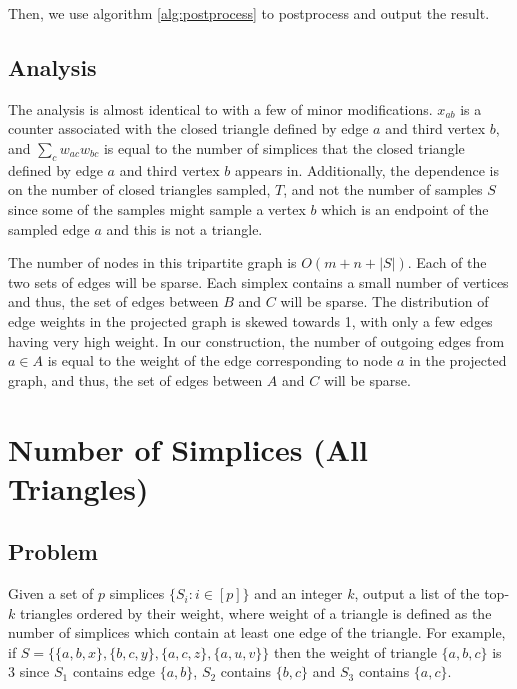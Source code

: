 \documentclass{article}
\begin{document}
Then, we use algorithm \ref{alg:postprocess} to postprocess and output the result.


\subsection{Analysis}

The analysis is almost identical to \cite{diamond} with a few
of minor modifications.
$x_{ab}$ is a counter associated with
the closed triangle defined by edge $a$ and third vertex $b$,
and $\sum\limits_c w_{ac}w_{bc}$ is equal to the number of 
simplices that the closed triangle defined by edge $a$ and 
third vertex $b$ appears in.
Additionally, the dependence is on the number of closed triangles sampled, $T$,
and not the number of samples $S$ since some of the samples might 
sample a vertex $b$ which is an endpoint of the sampled edge $a$ and this
is not a triangle.

The number of nodes in this tripartite graph is $O(m + n + |S|)$.
Each of the two sets of edges will be sparse.
Each simplex contains a small number of vertices and thus,
the set of edges between $B$ and $C$ will be sparse.
The distribution of edge weights in the projected graph is skewed
towards 1, with only a few edges having very high weight. In our construction,
the number of outgoing edges from $a \in A$ is equal to the weight
of the edge corresponding to node $a$ in the projected graph,
and thus, the set of edges between $A$ and $C$ will be sparse.



\section{Number of Simplices (All Triangles)}

\subsection{Problem}
Given a set of $p$ simplices $\{S_i : i \in [p]\}$ and
an integer $k$, output a list of the top-$k$
triangles ordered by their weight, where weight of a 
triangle is defined as the number of simplices which
contain at least one edge of the triangle.
For example, if $S = \{\{a,b,x\}, \{b,c,y\}, 
\{a,c,z\}, \{a,u,v\} \}$ then the weight of triangle $\{a,b,c\}$ is
3 since $S_1$ contains edge $\{a,b\}$, $S_2$ contains
$\{b,c\}$ and $S_3$ contains $\{a,c\}$.
\end{document}
